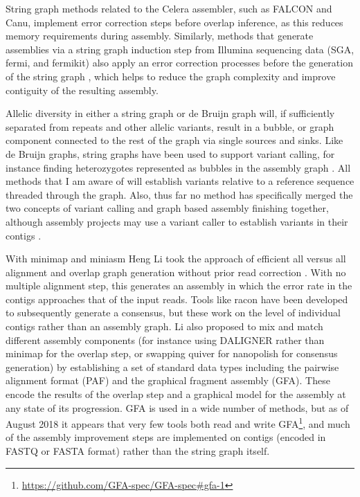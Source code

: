 \documentclass[a4paper,12pt,numbered,oneside]{Classes/PhDThesisPSnPDF}
\begin{document}
String graph methods related to the Celera assembler, such as FALCON and Canu, implement error correction steps before overlap inference, as this reduces memory requirements during assembly.
Similarly, methods that generate assemblies via a string graph induction step from Illumina sequencing data (SGA, fermi, and fermikit) also apply an error correction processes before the generation of the string graph \cite{simpson2012efficient,simpson2014exploring,li2015fermikit}, which helps to reduce the graph complexity and improve contiguity of the resulting assembly.

Allelic diversity in either a string graph or de Bruijn graph will, if sufficiently separated from repeats and other allelic variants, result in a bubble, or graph component connected to the rest of the graph via single sources and sinks.
Like de Bruijn graphs, string graphs have been used to support variant calling, for instance finding heterozygotes represented as bubbles in the assembly graph \cite{li2012exploring}.
All methods that I am aware of will establish variants relative to a reference sequence threaded through the graph.
Also, thus far no method has specifically merged the two concepts of variant calling and graph based assembly finishing together, although assembly projects may use a variant caller to establish variants in their contigs \cite{jain2018nanopore,schmid2018pushing}.

With minimap and miniasm Heng Li took the approach of efficient all versus all alignment and overlap graph generation without prior read correction \cite{li2016minimap}.
With no multiple alignment step, this generates an assembly in which the error rate in the contigs approaches that of the input reads.
Tools like racon \cite{vaser2017fast} have been developed to subsequently generate a consensus, but these work on the level of individual contigs rather than an assembly graph.
Li \cite{li2016minimap} also proposed to mix and match different assembly components (for instance using DALIGNER \cite{myers2014efficient} rather than minimap for the overlap step, or swapping quiver for nanopolish for consensus generation) by establishing a set of standard data types including the pairwise alignment format (PAF) and the graphical fragment assembly (GFA).
These encode the results of the overlap step and a graphical model for the assembly at any state of its progression.
GFA is used in a wide number of methods, but as of August 2018 it appears that very few tools both read and write GFA\footnote{\url{https://github.com/GFA-spec/GFA-spec\#gfa-1}}, and much of the assembly improvement steps are implemented on contigs (encoded in FASTQ or FASTA format) rather than the string graph itself.
\end{document}
